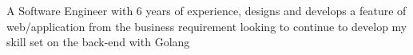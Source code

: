 


\begin{cvparagraph}


    A Software Engineer with 6 years of experience, designs and develops a feature of web/application from the business requirement looking to continue to develop my skill set on the back-end with Golang

\end{cvparagraph}
